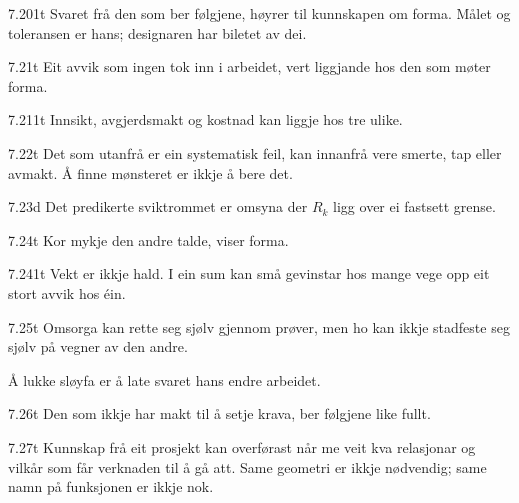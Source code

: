 \begin{formproposition}{7.201}{t}
Svaret frå den som ber følgjene, høyrer til kunnskapen om forma. Målet og toleransen er hans; designaren har biletet av dei.
\end{formproposition}

\begin{formproposition}{7.21}{t}
Eit avvik som ingen tok inn i arbeidet, vert liggjande hos den som møter forma.
\end{formproposition}

\begin{formproposition}{7.211}{t}
Innsikt, avgjerdsmakt og kostnad kan liggje hos tre ulike.
\end{formproposition}

\begin{formproposition}{7.22}{t}
Det som utanfrå er ein systematisk feil, kan innanfrå vere smerte, tap eller avmakt. Å finne mønsteret er ikkje å bere det.
\end{formproposition}

\begin{formproposition}{7.23}{d}
Det predikerte sviktrommet er omsyna der \(R_{k}\) ligg over ei fastsett grense.
\end{formproposition}

\begin{formproposition}{7.24}{t}
Kor mykje den andre talde, viser forma.
\end{formproposition}

\begin{formproposition}{7.241}{t}
Vekt er ikkje hald. I ein sum kan små gevinstar hos mange vege opp eit stort avvik hos éin.
\end{formproposition}

\begin{formproposition}{7.25}{t}
Omsorga kan rette seg sjølv gjennom prøver, men ho kan ikkje stadfeste seg sjølv på vegner av den andre.

Å lukke sløyfa er å late svaret hans endre arbeidet.
\end{formproposition}

\begin{formproposition}{7.26}{t}
Den som ikkje har makt til å setje krava, ber følgjene like fullt.
\end{formproposition}

\begin{formproposition}{7.27}{t}
Kunnskap frå eit prosjekt kan overførast når me veit kva relasjonar og vilkår som får verknaden til å gå att. Same geometri er ikkje nødvendig; same namn på funksjonen er ikkje nok.
\end{formproposition}

